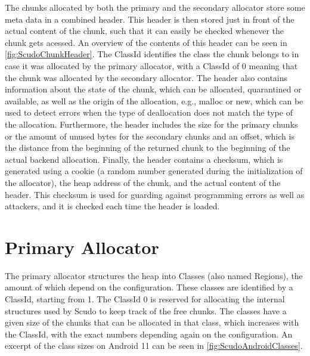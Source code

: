\documentclass[a4paper,11pt,oneside]{report}
\begin{document}
The chunks allocated by both the primary and the secondary allocator store some
meta data in a combined header. This header is then stored just in front of the
actual content of the chunk, such that it can easily be checked whenever the
chunk gets acessed. An overview of the contents of this header can be seen
in \autoref{fig:ScudoChunkHeader}. The ClassId identifies the class the chunk
belongs to in case it was allocated by the primary allocator, with a ClassId
of 0 meaning that the chunk was allocated by the secondary allocator. The
header also contains information about the state of the chunk, which can be
allocated, quarantined or available, as well as the origin of the allocation,
e.g., malloc or new, which can be used to detect errors when the type of
deallocation does not match the type of the allocation. Furthermore, the
header includes the size for the primary chunks or the amount of unused bytes
for the secondary chunks and an offset, which is the distance from the beginning
of the returned chunk to the beginning of the actual backend allocation.
Finally, the header contains a checksum, which is generated using a cookie (a
random number generated during the initialization of the allocator), the heap
address of the chunk, and the actual content of the header. This checksum is
used for guarding against programming errors as well as attackers, and it is
checked each time the header is loaded.

\section{Primary Allocator}


The primary allocator structures the heap into Classes (also named Regions), the
amount of which depend on the configuration. These classes are identified by a
ClassId, starting from 1. The ClassId 0 is reserved for allocating the internal
structures used by Scudo to keep track of the free chunks.
The classes have a given size of the chunks that can be allocated in that class,
which increases with the ClassId, with the exact numbers depending again on the
configuration. An excerpt of the class sizes on Android 11 can be seen in
\autoref{fig:ScudoAndroidClasses}.
\end{document}
